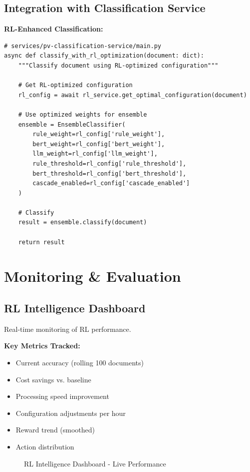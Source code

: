 \subsection{Integration with Classification Service}

\textbf{RL-Enhanced Classification:}
\begin{lstlisting}[style=pythonstyle]
# services/pv-classification-service/main.py
async def classify_with_rl_optimization(document: dict):
    """Classify document using RL-optimized configuration"""
    
    # Get RL-optimized configuration
    rl_config = await rl_service.get_optimal_configuration(document)
    
    # Use optimized weights for ensemble
    ensemble = EnsembleClassifier(
        rule_weight=rl_config['rule_weight'],
        bert_weight=rl_config['bert_weight'],
        llm_weight=rl_config['llm_weight'],
        rule_threshold=rl_config['rule_threshold'],
        bert_threshold=rl_config['bert_threshold'],
        cascade_enabled=rl_config['cascade_enabled']
    )
    
    # Classify
    result = ensemble.classify(document)
    
    return result
\end{lstlisting}

\section{Monitoring \& Evaluation}

\subsection{RL Intelligence Dashboard}

Real-time monitoring of RL performance.

\textbf{Key Metrics Tracked:}
\begin{itemize}
    \item Current accuracy (rolling 100 documents)
    \item Cost savings vs. baseline
    \item Processing speed improvement
    \item Configuration adjustments per hour
    \item Reward trend (smoothed)
    \item Action distribution
\end{itemize}

\begin{figure}[h]
\centering
{}
\caption{RL Intelligence Dashboard - Live Performance}
\label{fig:rl-dashboard-live}
\end{figure}

